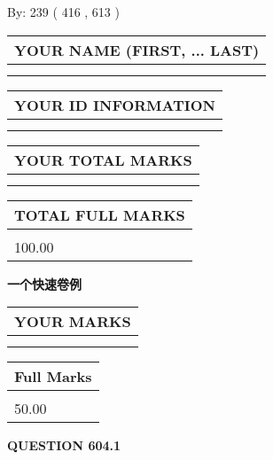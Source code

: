 \documentclass{ctexart}
\begin{document}
   
\hspace{1.0in} By: 
 239 ( 416 ,  613 )
   
   
   
   
\newpage 
\setcounter{page}{ 
   604001 } 
   
   
   
   
\noindent\begin{tabular}{|l|}
\hline
YOUR NAME (FIRST, ... LAST)  \\
\hline
 \\ 
 \\ 
\hline
\end{tabular}
\hspace{0.05in} \begin{tabular}{|l|}
\hline
 YOUR   ID   INFORMATION  \\
\hline
 \\ 
 \\ 
\hline
\end{tabular}
   
   
\vspace{0.2in}\noindent\begin{tabular}{|l|}
\hline
YOUR TOTAL MARKS  \\
\hline
 \\ 
 \\ 
\hline
\end{tabular}
\hspace{0.05in} \begin{tabular}{|l|}
\hline
TOTAL FULL MARKS  \\
\hline
 \\ 
100.00 \\
\hline
\end{tabular}
   
   
 \vspace{0.2in}
{\LARGE {\textbf{ 一个快速卷例}}}
   
   
  
\vspace{0.2in}
  
\noindent\begin{tabular}{|l|}
\hline
 YOUR MARKS  \\
\hline
 \\ 
 \\ 
\hline
\end{tabular}
\hspace{0.05in} \begin{tabular}{|l|}
\hline
 Full Marks  \\
\hline
 \\ 
50.00 \\
\hline
\end{tabular}
{\textbf{\Large{QUESTION
604.1 
}}}
  
\end{document}
